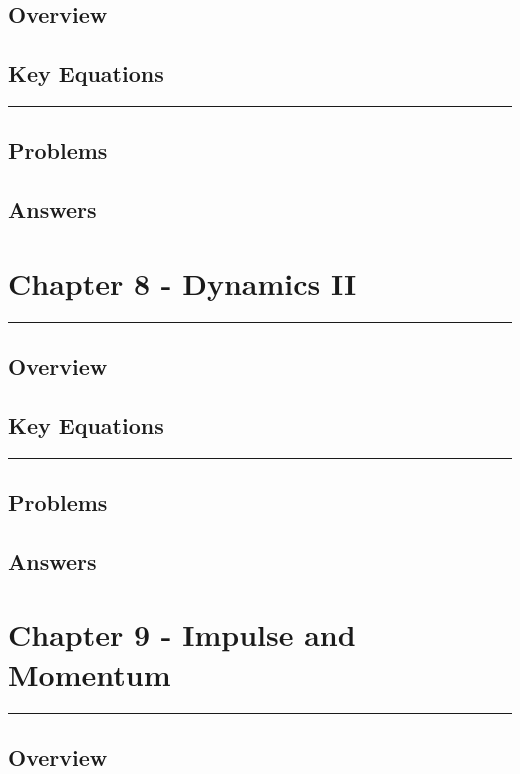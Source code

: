 \documentclass[a4paper,12pt]{article}
\begin{document}
\subsection*{Overview}
\subsection*{Key Equations}

\begin{center}
  \rule{6cm}{0.5pt}
\end{center}
\subsection*{Problems}
\subsection*{Answers}

\pagebreak
\section*{Chapter 8 - Dynamics II}
\rule{\linewidth}{1pt}
\subsection*{Overview}
\subsection*{Key Equations}

\begin{center}
  \rule{6cm}{0.5pt}
\end{center}
\subsection*{Problems}
\subsection*{Answers}

\pagebreak
\section*{Chapter 9 - Impulse and Momentum}
\rule{\linewidth}{1pt}
\subsection*{Overview}
\end{document}
